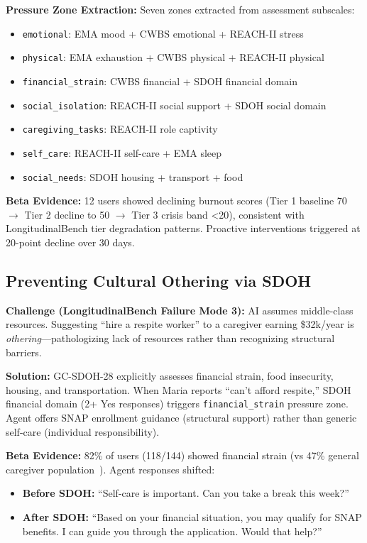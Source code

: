 \documentclass{article}
\begin{document}
\textbf{Pressure Zone Extraction:} Seven zones extracted from assessment subscales:
\begin{itemize}
    \item \texttt{emotional}: EMA mood + CWBS emotional + REACH-II stress
    \item \texttt{physical}: EMA exhaustion + CWBS physical + REACH-II physical
    \item \texttt{financial\_strain}: CWBS financial + SDOH financial domain
    \item \texttt{social\_isolation}: REACH-II social support + SDOH social domain
    \item \texttt{caregiving\_tasks}: REACH-II role captivity
    \item \texttt{self\_care}: REACH-II self-care + EMA sleep
    \item \texttt{social\_needs}: SDOH housing + transport + food
\end{itemize}

\textbf{Beta Evidence:} 12 users showed declining burnout scores (Tier 1 baseline 70 $\rightarrow$ Tier 2 decline to 50 $\rightarrow$ Tier 3 crisis band <20), consistent with LongitudinalBench tier degradation patterns. Proactive interventions triggered at 20-point decline over 30 days.

%
\subsection{Preventing Cultural Othering via SDOH}%
\label{subsec:PreventingCulturalOtheringviaSDOH}%
\textbf{Challenge (LongitudinalBench Failure Mode 3):} AI assumes middle-class resources. Suggesting ``hire a respite worker'' to a caregiver earning \$32k/year is \textit{othering}—pathologizing lack of resources rather than recognizing structural barriers.

\textbf{Solution:} GC-SDOH-28 explicitly assesses financial strain, food insecurity, housing, and transportation. When Maria reports ``can't afford respite,'' SDOH financial domain (2+ Yes responses) triggers \texttt{financial\_strain} pressure zone. Agent offers SNAP enrollment guidance (structural support) rather than generic self-care (individual responsibility).

\textbf{Beta Evidence:} 82\% of users (118/144) showed financial strain (vs 47\% general caregiver population~\cite{aarp2025}). Agent responses shifted:
\begin{itemize}
    \item \textbf{Before SDOH:} ``Self-care is important. Can you take a break this week?''
    \item \textbf{After SDOH:} ``Based on your financial situation, you may qualify for SNAP benefits. I can guide you through the application. Would that help?''
\end{itemize}
\end{document}
